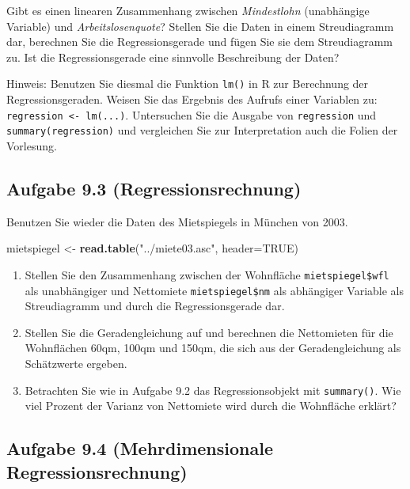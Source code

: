 \documentclass[
]{article}
\newenvironment{Shaded}{\begin{snugshade}}{\end{snugshade}}
\newcommand{\AttributeTok}[1]{\textcolor[rgb]{0.13,0.29,0.53}{#1}}
\newcommand{\ConstantTok}[1]{\textcolor[rgb]{0.56,0.35,0.01}{#1}}
\newcommand{\FunctionTok}[1]{\textcolor[rgb]{0.13,0.29,0.53}{\textbf{#1}}}
\newcommand{\NormalTok}[1]{#1}
\newcommand{\OtherTok}[1]{\textcolor[rgb]{0.56,0.35,0.01}{#1}}
\newcommand{\StringTok}[1]{\textcolor[rgb]{0.31,0.60,0.02}{#1}}
\providecommand{\tightlist}{%
  \setlength{\itemsep}{0pt}\setlength{\parskip}{0pt}}
\begin{document}
Gibt es einen linearen Zusammenhang zwischen \emph{Mindestlohn}
(unabhängige Variable) und \emph{Arbeitslosenquote}? Stellen Sie die
Daten in einem Streudiagramm dar, berechnen Sie die Regressionsgerade
und fügen Sie sie dem Streudiagramm zu. Ist die Regressionsgerade eine
sinnvolle Beschreibung der Daten?

Hinweis: Benutzen Sie diesmal die Funktion \texttt{lm()} in R zur
Berechnung der Regressionsgeraden. Weisen Sie das Ergebnis des Aufrufs
einer Variablen zu: \texttt{regression\ \textless{}-\ lm(...)}.
Untersuchen Sie die Ausgabe von \texttt{regression} und
\texttt{summary(regression)} und vergleichen Sie zur Interpretation auch
die Folien der Vorlesung.

\hypertarget{aufgabe-9.3-regressionsrechnung}{%
\subsection{Aufgabe 9.3
(Regressionsrechnung)}\label{aufgabe-9.3-regressionsrechnung}}

Benutzen Sie wieder die Daten des Mietspiegels in München von 2003.

\begin{Shaded}
\begin{Highlighting}[]
\NormalTok{mietspiegel }\OtherTok{\textless{}{-}} \FunctionTok{read.table}\NormalTok{(}\StringTok{"../miete03.asc"}\NormalTok{, }\AttributeTok{header=}\ConstantTok{TRUE}\NormalTok{)}
\end{Highlighting}
\end{Shaded}

\begin{enumerate}
\def\labelenumi{\alph{enumi})}
\tightlist
\item
  Stellen Sie den Zusammenhang zwischen der Wohnfläche
  \texttt{mietspiegel\$wfl} als unabhängiger und Nettomiete
  \texttt{mietspiegel\$nm} als abhängiger Variable als Streudiagramm und
  durch die Regressionsgerade dar.
\item
  Stellen Sie die Geradengleichung auf und berechnen die Nettomieten für
  die Wohnflächen 60qm, 100qm und 150qm, die sich aus der
  Geradengleichung als Schätzwerte ergeben.
\item
  Betrachten Sie wie in Aufgabe 9.2 das Regressionsobjekt mit
  \texttt{summary()}. Wie viel Prozent der Varianz von Nettomiete wird
  durch die Wohnfläche erklärt?
\end{enumerate}

\hypertarget{aufgabe-9.4-mehrdimensionale-regressionsrechnung}{%
\subsection{Aufgabe 9.4 (Mehrdimensionale
Regressionsrechnung)}\label{aufgabe-9.4-mehrdimensionale-regressionsrechnung}}
\end{document}

